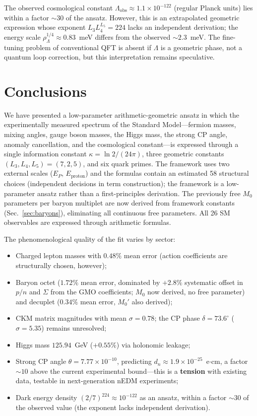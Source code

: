 \documentclass[aps,prd,reprint,twocolumn,showpacs,superscriptaddress]{revtex4-2}
\begin{document}
The observed cosmological constant $\Lambda_{\text{obs}} \approx
1.1 \times 10^{-122}$ (regular Planck units) lies within a factor
$\sim 30$ of the ansatz.  However, this is an extrapolated geometric
expression whose exponent $L_3 L_4^{L_5} = 224$ lacks an independent
derivation; the energy scale $\rho_\Lambda^{1/4} \approx 0.83$~meV
differs from the observed $\sim 2.3$~meV.  The fine-tuning problem
of conventional QFT is absent if $\Lambda$ is a geometric phase,
not a quantum loop correction, but this interpretation remains
speculative.

\section{Conclusions}
\label{sec:conclusions}

We have presented a low-parameter arithmetic-geometric ansatz in which
the experimentally measured spectrum of the Standard Model---fermion
masses, mixing angles, gauge boson masses, the Higgs mass, the strong
CP angle, anomaly cancellation, and the cosmological constant---is
expressed through a single information constant
$\kappa = \ln 2/(24\pi)$, three geometric constants
$(L_3, L_4, L_5) = (7, 2, 5)$, and six quark primes.
The framework uses two external scales ($E_P$, $E_{\text{proton}}$)
and the formulas contain an estimated 58 structural choices (independent
decisions in term construction); the framework is a low-parameter ansatz
rather than a first-principles derivation.  The previously free $M_0$
parameters per baryon multiplet are now derived from framework constants
(Sec.~\ref{sec:baryons}), eliminating all continuous free parameters.
All 26 SM observables are expressed through arithmetic formulas.

The phenomenological quality of the fit varies by sector:
\begin{itemize}
\item Charged lepton masses with $0.48\%$ mean error (action
coefficients are structurally chosen, however);
\item Baryon octet ($1.72\%$ mean error, dominated by $+2.8\%$
systematic offset in $p/n$ and $\Sigma$ from the GMO coefficients;
$M_0$ now derived, no free parameter) and decuplet ($0.34\%$ mean
error, $M_0'$ also derived);
\item CKM matrix magnitudes with mean $\sigma = 0.78$; the CP phase
$\delta = 73.6^\circ$ ($\sigma = 5.35$) remains unresolved;
\item Higgs mass $125.94$~GeV ($+0.55\%$) via holonomic leakage;
\item Strong CP angle $\theta = 7.77 \times 10^{-10}$, predicting
$d_n \approx 1.9 \times 10^{-25}$~e$\cdot$cm, a factor $\sim 10$ above
the current experimental bound---this is a \textbf{tension} with
existing data, testable in next-generation nEDM experiments;
\item Dark energy density $(2/7)^{224} \approx 10^{-122}$ as an ansatz,
within a factor $\sim 30$ of the observed value (the exponent lacks
independent derivation).
\end{itemize}
\end{document}

